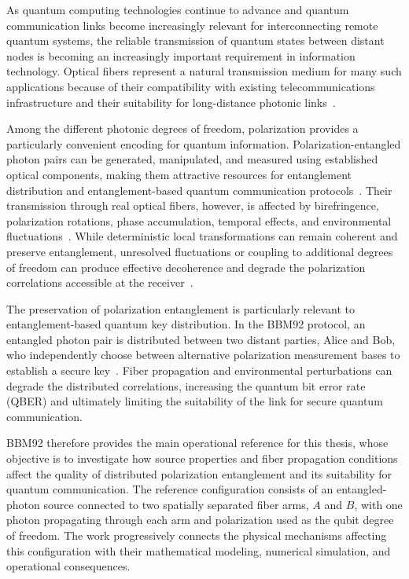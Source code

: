 
As quantum computing technologies continue to advance and quantum communication
links become increasingly relevant for interconnecting remote quantum systems, the
reliable transmission of quantum states between distant nodes is becoming an
increasingly important requirement in information technology. Optical fibers represent a
natural transmission medium for many such applications because of their
compatibility with existing telecommunications infrastructure and their suitability
for long-distance photonic links~\cite{wehner_elkouss_hanson_quantum_internet_2018, abadal2024electromagnetic}.

Among the different photonic degrees of freedom, polarization provides a
particularly convenient encoding for quantum information. Polarization-entangled
photon pairs can be generated, manipulated, and measured using established optical
components, making them attractive resources for entanglement distribution and
entanglement-based quantum communication protocols~\cite{bennett_brassard_mermin_BBM92_1992}. Their transmission through real optical
fibers, however, is affected by birefringence, polarization rotations, phase
accumulation, temporal effects, and environmental fluctuations~\cite{dowling_2023_polarization_control}. While deterministic local
transformations can remain coherent and preserve entanglement, unresolved
fluctuations or coupling to additional degrees of freedom can produce effective
decoherence and degrade the polarization correlations accessible at the receiver~\cite{poon_law_stochastic_pmd_2008,
brodsky_loss_polarization_entanglement_2011}.

The preservation of polarization entanglement is particularly relevant to
entanglement-based quantum key distribution. In the BBM92 protocol, an entangled
photon pair is distributed between two distant parties, Alice and Bob, who
independently choose between alternative polarization measurement bases to
establish a secure key~\cite{bennett_brassard_mermin_BBM92_1992}. Fiber propagation and environmental
perturbations can degrade the distributed correlations, increasing the quantum bit
error rate (QBER) and ultimately limiting the suitability of the link for secure
quantum communication.

BBM92 therefore provides the main operational reference for this thesis, whose
objective is to investigate how source properties and fiber propagation conditions
affect the quality of distributed polarization entanglement and its suitability for
quantum communication. The reference configuration consists of an entangled-photon
source connected to two spatially separated fiber arms, \(A\) and \(B\), with one
photon propagating through each arm and polarization used as the qubit degree of
freedom. The work progressively connects the physical mechanisms affecting this
configuration with their mathematical modeling, numerical simulation, and
operational consequences.

